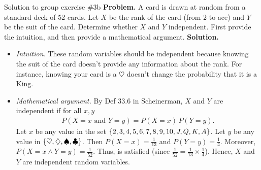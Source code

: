 \documentclass[10pt]{beamer}
\begin{document}
\begin{frame}{Solution to group exercise \#3b}
\small
\textbf{Problem.} A card is drawn at random from a standard deck of 52 cards. Let $X$ be the rank of the card (from 2 to ace) and $Y$ be the suit of the card. Determine whether $X$ and $Y$ independent. First provide the intuition, and then provide a mathematical argument.  
\vfill 
\vspace{-.2cm}
\textbf{Solution.}
\vspace{-.2cm}
\begin{itemize}
\item \textit{Intuition.} These random variables should be independent because knowing the suit of the card doesn't provide any information about the rank.  For instance, knowing your card is a $\heartsuit$ doesn't change the probability that it is a King.
\vfill 
\item \textit{Mathematical argument.} By Def 33.6 in Scheinerman, $X$ and $Y$ are independent if for all $x,y$
%
\begin{align}
P(X=x \text{ and } Y=y) = P(X=x) \, P(Y=y).
\label{eqn:def_independence}
\end{align}
%
Let $x$ be any value in the set $\{ {2,3,4,5,6,7,8,9,10,J,Q,K,A} \}$.  Let $y$ be any value in $\{ {\heartsuit, \diamondsuit, \spadesuit, \clubsuit} \}$. Then $P(X=x) = \frac{1}{13}$ and $P(Y=y) = \frac{1}{4}$.   Moreover, $P(X=x \land Y=y) = \frac{1}{52}.$  Thus,  is satisfied (since $\frac{1}{52} = 	\frac{1}{13} \times \frac{1}{4}$).   Hence, $X$ and $Y$ are independent random variables.
\end{itemize}

\end{frame}
\end{document}
